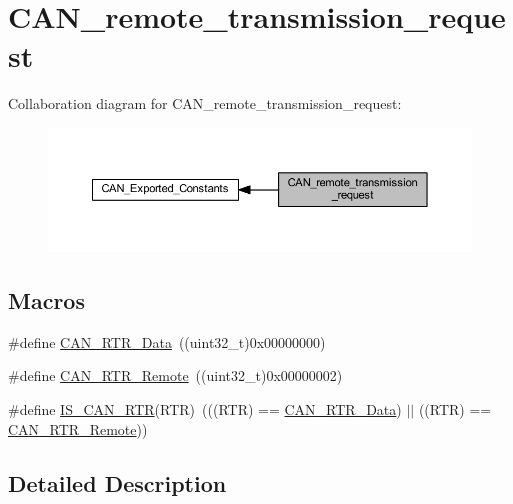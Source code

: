 \hypertarget{group___c_a_n__remote__transmission__request}{}\section{C\+A\+N\+\_\+remote\+\_\+transmission\+\_\+request}
\label{group___c_a_n__remote__transmission__request}
Collaboration diagram for C\+A\+N\+\_\+remote\+\_\+transmission\+\_\+request\+:
\nopagebreak
\begin{figure}[H]
\begin{center}
\leavevmode
\includegraphics[width=350pt]{group___c_a_n__remote__transmission__request}
\end{center}
\end{figure}
\subsection*{Macros}
\begin{DoxyCompactItemize}
\item 
\#define \hyperlink{group___c_a_n__remote__transmission__request_ga2407c3a8b2cd97bd651143aa959219f1}{C\+A\+N\+\_\+\+R\+T\+R\+\_\+\+Data}~((uint32\+\_\+t)0x00000000)
\item 
\#define \hyperlink{group___c_a_n__remote__transmission__request_ga42e95ddfb02d88c82de84058fb0fb349}{C\+A\+N\+\_\+\+R\+T\+R\+\_\+\+Remote}~((uint32\+\_\+t)0x00000002)
\item 
\#define \hyperlink{group___c_a_n__remote__transmission__request_ga3379997ad4da6fc4d7975c52b891bdc0}{I\+S\+\_\+\+C\+A\+N\+\_\+\+R\+TR}(R\+TR)~(((R\+TR) == \hyperlink{group___c_a_n__remote__transmission__request_ga2407c3a8b2cd97bd651143aa959219f1}{C\+A\+N\+\_\+\+R\+T\+R\+\_\+\+Data}) $\vert$$\vert$ ((R\+TR) == \hyperlink{group___c_a_n__remote__transmission__request_ga42e95ddfb02d88c82de84058fb0fb349}{C\+A\+N\+\_\+\+R\+T\+R\+\_\+\+Remote}))
\end{DoxyCompactItemize}


\subsection{Detailed Description}


